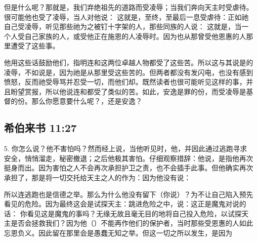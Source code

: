 但是什么呢？那就是，我们弃绝祖先的道路而受凌辱；当我们奔向天主时受虐待。很可能他也受了凌辱，当人对他说： 这就是，至终，至最后一息受虐待：正如祂自己受凌辱，听见那些祂为之被钉十字架的人，那些同族的人说： 这就是，当一个人受自己家族的人，或受他正在施恩的人凌辱时。因为也从那曾受他恩惠的人那里遭受了这些事。\par

他用这些话鼓励他们，指明连和这两位卓越人物都受了这些苦。所以这与其说是的凌辱，不如说是，因为祂是从那里受这些苦的。但两者都没有发闪电，也没有感到愤怒，反而祂受辱骂并忍受一切，而他们却。既然读者也很可能听见这样的事，并且盼望赏报，所以他说连和都受了类似的苦。如此，安逸是罪的份，而受凌辱是基督的份。那么你愿意要什么呢？，还是安逸？\par


\subsection{希伯来书 11:27}

5.  你怎么说？他不害怕吗？然而经上说，当他听见时，他，并因此通过逃跑寻求安全，悄悄溜走，秘密撤退；之后他极其害怕。仔细观察措辞：他说，是指他再次挺身而出。因为害怕之人不会再次承担护卫之责，也不会插手此事。但他确实再次承担了，那是将一切交托给天主之人的作为：因为他没有说：\par

所以连逃跑也是信德之举。那么为什么他没有留下（你说）？为不让自己陷入预先看见的危险。因为最终这会是试探天主：跳进危险之中，说：这正是魔鬼对说的话： 你看见这是魔鬼的事吗？无缘无故且毫无目的地将自己投入危险，以试探天主是否会拯救我们？因为他（）不能再作他们的保护者，当时那些受恩惠的人如此忘恩负义。因此留在那里会是愚蠢无知之举。但这一切之所以发生，是因为\par

